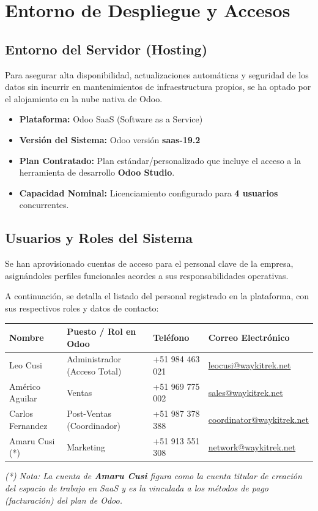 \section{Entorno de Despliegue y Accesos}

\subsection{Entorno del Servidor (Hosting)}
Para asegurar alta disponibilidad, actualizaciones automáticas y seguridad de los datos sin incurrir en mantenimientos de infraestructura propios, se ha optado por el alojamiento en la nube nativa de Odoo.

\begin{itemize}
    \item \textbf{Plataforma:} Odoo SaaS (Software as a Service)
    \item \textbf{Versión del Sistema:} Odoo versión \textbf{saas-19.2}
    \item \textbf{Plan Contratado:} Plan estándar/personalizado que incluye el acceso a la herramienta de desarrollo \textbf{Odoo Studio}.
    \item \textbf{Capacidad Nominal:} Licenciamiento configurado para \textbf{4 usuarios} concurrentes.
\end{itemize}

\subsection{Usuarios y Roles del Sistema}
Se han aprovisionado cuentas de acceso para el personal clave de la empresa, asignándoles perfiles funcionales acordes a sus responsabilidades operativas.

A continuación, se detalla el listado del personal registrado en la plataforma, con sus respectivos roles y datos de contacto:

\vspace{0.3cm}
\begin{center}
\renewcommand{\arraystretch}{1.5}
\begin{tabular}{|l|l|l|p{4.5cm}|}
\hline
\rowcolor{waykigreen!20}
\textbf{Nombre} & \textbf{Puesto / Rol en Odoo} & \textbf{Teléfono} & \textbf{Correo Electrónico} \\
\hline
Leo Cusi & Administrador (Acceso Total) & +51 984 463 021 & \href{mailto:leocusi@waykitrek.net}{leocusi@waykitrek.net} \\
\hline
Américo Aguilar & Ventas & +51 969 775 002 & \href{mailto:sales@waykitrek.net}{sales@waykitrek.net} \\
\hline
Carlos Fernandez & Post-Ventas (Coordinador) & +51 987 378 388 & \href{mailto:coordinator@waykitrek.net}{coordinator@waykitrek.net} \\
\hline
Amaru Cusi (*) & Marketing & +51 913 551 308 & \href{mailto:network@waykitrek.net}{network@waykitrek.net} \\
\hline
\end{tabular}
\end{center}
\vspace{0.2cm}

\textit{(*) Nota: La cuenta de \textbf{Amaru Cusi} figura como la cuenta titular de creación del espacio de trabajo en SaaS y es la vinculada a los métodos de pago (facturación) del plan de Odoo.}
